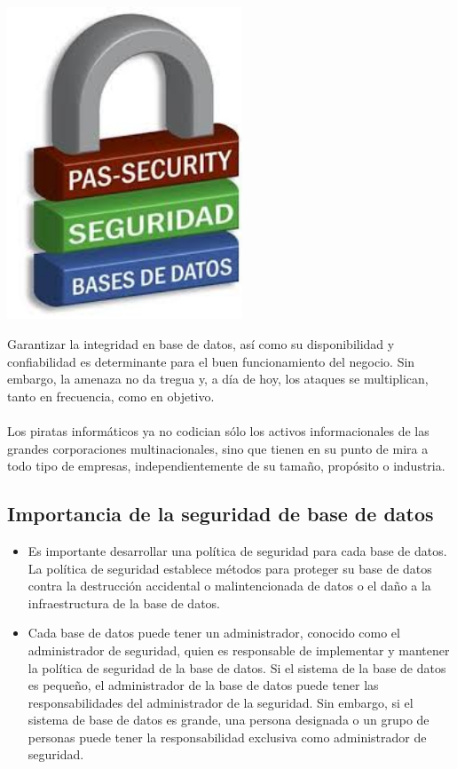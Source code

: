 \documentclass[%
 reprint,
 amsmath,amssymb,
 aps,
]{revtex4-1}
\begin{document}
\begin{center}
	\includegraphics[width=7cm]{./Imagenes/imagen1}
\end{center}	
Garantizar la integridad en base de datos, así como su disponibilidad y confiabilidad es determinante para el buen funcionamiento del negocio. Sin embargo, la amenaza no da tregua y, a día de hoy, los ataques se multiplican, tanto en frecuencia, como en objetivo. \\\\  Los piratas informáticos ya no codician sólo los activos informacionales de las grandes corporaciones multinacionales, sino que tienen en su punto de mira a todo tipo de empresas, independientemente de su tamaño, propósito o industria.


\subsection{Importancia de la seguridad de base de datos}
\begin{itemize}
	\item Es importante desarrollar una política de seguridad para cada base de datos. La política de seguridad establece métodos para proteger su base de datos contra la destrucción accidental o malintencionada de datos o el daño a la infraestructura de la base de datos.
	\item Cada base de datos puede tener un administrador, conocido como el administrador de seguridad, quien es responsable de implementar y mantener la política de seguridad de la base de datos. Si el sistema de la base de datos es pequeño, el administrador de la base de datos puede tener las responsabilidades del administrador de la seguridad. Sin embargo, si el sistema de base de datos es grande, una persona designada o un grupo de personas puede tener la responsabilidad exclusiva como administrador de seguridad. \cite{oracle}
\end{itemize}
\end{document}
